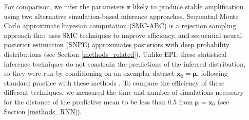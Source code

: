 \documentclass[11pt]{article}
\begin{document}
For comparison, we infer the parameters $\mathbf{z}$ likely to produce stable amplification using two alternative simulation-based inference approaches.
Sequential Monte Carlo approximate bayesian computation (SMC-ABC) \cite{sisson2007sequential} is a rejection sampling approach that uses SMC techniques to improve efficiency, and sequential neural posterior estimation (SNPE) \cite{gonccalves2019training} approximates posteriors with deep probability distributions (see Section \ref{methods_related}).
Unlike EPI, these statistical inference techniques do not constrain the predictions of the inferred distribution, so they were run by conditioning on an exemplar dataset  $\mathbf{x}_0 = \bm{\mu}$, following standard practice with these methods \cite{sisson2007sequential, gonccalves2019training}.
To compare the efficiency of these different techniques, we measured the time and number of simulations necessary for the distance of the predictive mean to be less than 0.5 from $\bm{\mu} = \mathbf{x}_0$ (see Section \ref{methods_RNN}).
\end{document}
